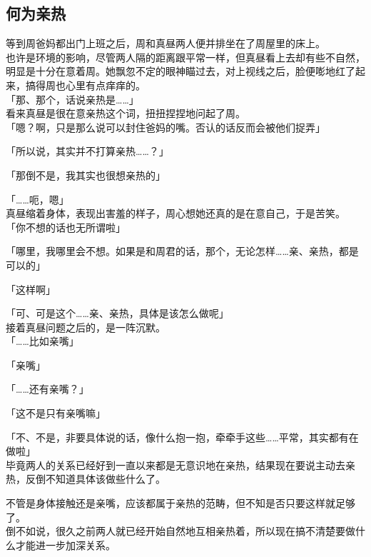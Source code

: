 \subsection{何为亲热}

等到周爸妈都出门上班之后，周和真昼两人便并排坐在了周屋里的床上。\\

也许是环境的影响，尽管两人隔的距离跟平常一样，但真昼看上去却有些不自然，明显是十分在意着周。她飘忽不定的眼神瞄过去，对上视线之后，脸便嘭地红了起来，搞得周也心里有点痒痒的。\\

「那、那个，话说亲热是……」\\

看来真昼是很在意亲热这个词，扭扭捏捏地问起了周。\\

「嗯？啊，只是那么说可以封住爸妈的嘴。否认的话反而会被他们捉弄」

「所以说，其实并不打算亲热……？」

「那倒不是，我其实也很想亲热的」

「……呃，嗯」\\

真昼缩着身体，表现出害羞的样子，周心想她还真的是在意自己，于是苦笑。\\

「你不想的话也无所谓啦」

「哪里，我哪里会不想。如果是和周君的话，那个，无论怎样……亲、亲热，都是可以的」

「这样啊」

「可、可是这个……亲、亲热，具体是该怎么做呢」\\

接着真昼问题之后的，是一阵沉默。\\

「……比如亲嘴」

「亲嘴」

「……还有亲嘴？」

「这不是只有亲嘴嘛」

「不、不是，非要具体说的话，像什么抱一抱，牵牵手这些……平常，其实都有在做啦」\\

毕竟两人的关系已经好到一直以来都是无意识地在亲热，结果现在要说主动去亲热，反倒不知道具体该做些什么了。

不管是身体接触还是亲嘴，应该都属于亲热的范畴，但不知是否只要这样就足够了。\\

倒不如说，很久之前两人就已经开始自然地互相亲热着，所以现在搞不清楚要做什么才能进一步加深关系。\\

